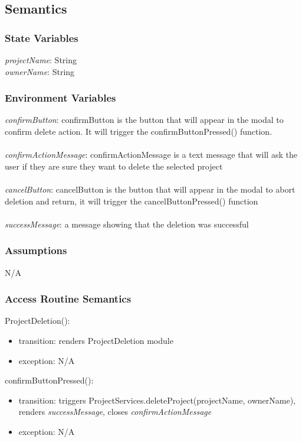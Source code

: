 \documentclass[12pt, titlepage]{article}
\begin{document}
	\subsection{Semantics}
	
	\subsubsection{State Variables}
	\textit{projectName}: String \\
	\textit{ownerName}: String
	
	\subsubsection{Environment Variables}
	
	\textit{confirmButton}: confirmButton is the button that will appear in the modal to confirm delete action. It will trigger the confirmButtonPressed() function. \\\\ 
	\textit{confirmActionMessage}: confirmActionMessage is a text message that will ask the user if they are sure they want to delete the selected project \\\\
	\textit{cancelButton}: cancelButton is the button that will appear in the modal to abort deletion and return, it will trigger the cancelButtonPressed() function \\\\ 
	\textit{successMessage}: a message showing that the deletion was successful
	
	\subsubsection{Assumptions}
	N/A
	
	\subsubsection{Access Routine Semantics}
	
	\noindent ProjectDeletion():
	\begin{itemize}
		\item transition: renders ProjectDeletion module
		\item exception: N/A
	\end{itemize}
	
	\noindent confirmButtonPressed():
	\begin{itemize}
		\item transition: triggers ProjectServices.deleteProject(projectName, ownerName), renders \textit{successMessage}, closes \textit{confirmActionMessage}
		\item exception: N/A
	\end{itemize}
	
\end{document}
